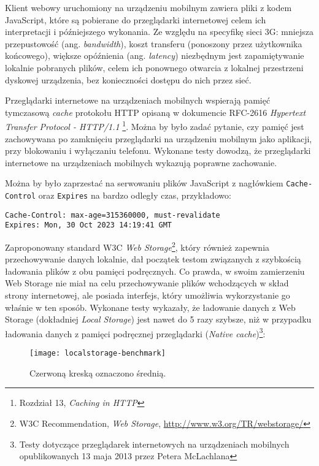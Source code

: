 Klient webowy uruchomiony na urządzeniu mobilnym zawiera pliki z kodem JavaScript, które są pobierane do przeglądarki internetowej celem ich interpretacji i późniejszego wykonania. Ze względu na specyfikę sieci 3G: mniejsza przepustowość (ang. \emph{bandwidth}), koszt transferu (ponoszony przez użytkownika końcowego), większe opóźnienia (ang. \emph{latency}) niezbędnym jest zapamiętywanie lokalnie pobranych plików, celem ich ponownego otwarcia z lokalnej przestrzeni dyskowej urządzenia, bez konieczności dostępu do nich przez sieć.

Przeglądarki internetowe na urządzeniach mobilnych wspierają pamięć tymczasową \emph{cache} protokołu HTTP opisaną w dokumencie RFC-2616 \emph{Hypertext Transfer Protocol - HTTP/1.1}\cite{http-rfc} \footnote{Rozdział 13, \emph{Caching in HTTP}}. Można by było zadać pytanie, czy pamięć jest zachowywana po zamknięciu przeglądarki na urządzeniu mobilnym jako aplikacji, przy blokowaniu i wyłączaniu telefonu. Wykonane testy dowodzą, że przeglądarki internetowe na urządzeniach mobilnych wykazują poprawne zachowanie\cite{http-cache-mobile-benchmark}.

Można by było zaprzestać na serwowaniu plików JavaScript z nagłówkiem \lstinline{Cache-Control} oraz \lstinline{Expires} na bardzo odległy czas, przykładowo:

\lstset{language=Octave}
\begin{lstlisting}
Cache-Control: max-age=315360000, must-revalidate
Expires: Mon, 30 Oct 2023 14:19:41 GMT
\end{lstlisting}

Zaproponowany standard W3C \emph{Web Storage}\cite{webstorage}\footnote{W3C Recommendation, {\em Web Storage}, \url{http://www.w3.org/TR/webstorage/}}, który również zapewnia przechowywanie danych lokalnie, dał początek testom związanych z szybkością ładowania plików z obu pamięci podręcznych. Co prawda, w swoim zamierzeniu Web Storage nie miał na celu przechowywanie plików wchodzących w skład strony internetowej, ale posiada interfejs, który umożliwia wykorzystanie go właśnie w ten sposób. Wykonane testy wykazały, że ładowanie danych z Web Storage (dokładniej \emph{Local Storage}) jest nawet do 5 razy szybsze, niż w przypadku ładowania danych z pamięci podręcznej przeglądarki (\emph{Native cache})\cite{http-cache-mobile-benchmark}\footnote{Testy dotyczące przeglądarek internetowych na urządzeniach mobilnych opublikowanych 13 maja 2013 przez Petera McLachlana}:

\begin{figure}[h!]
  \caption[Porównanie czasu ładowania danych z cache przeglądarki oraz Web Storage]{Czerwoną kreską oznaczono średnią.}
  \centering
    \texttt{[image: localstorage-benchmark]}
\end{figure}

